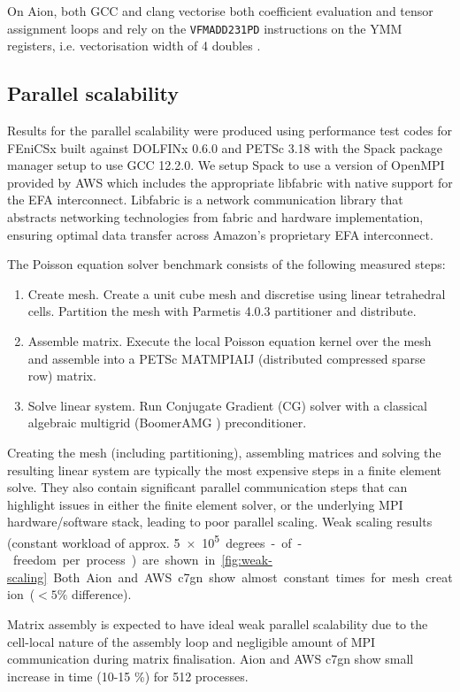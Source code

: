 On Aion, both GCC and clang vectorise both coefficient evaluation and tensor
assignment loops and rely on the \lstinline{VFMADD231PD} instructions on the
YMM registers, i.e. vectorisation width of 4 doubles
\citep{Godboltx86Clang,Godboltx86GCC}.

\subsection*{Parallel scalability}

Results for the parallel scalability were produced using performance test codes
for FEniCSx \citep{Wells2023} built against DOLFINx 0.6.0 and PETSc 3.18
\citep{petsc} with the Spack package manager setup to use GCC 12.2.0. We setup
Spack to use a version of OpenMPI provided by AWS which includes the appropriate
libfabric with native support for the EFA interconnect. Libfabric is a network
communication library that abstracts networking technologies from fabric and
hardware implementation, ensuring optimal data transfer across Amazon's
proprietary EFA interconnect.

The Poisson equation solver benchmark consists of the following measured steps:
\begin{enumerate}
    \item Create mesh. Create a unit cube mesh and discretise using linear
    tetrahedral cells. Partition the mesh with Parmetis 4.0.3 partitioner
    \citep{Karypis1998} and distribute.
    \item Assemble matrix. Execute the local Poisson equation kernel over the
    mesh and assemble into a PETSc MATMPIAIJ (distributed compressed sparse row)
    matrix.
    \item Solve linear system. Run Conjugate Gradient (CG) solver with a classical algebraic
    multigrid (BoomerAMG \citep{hypre}) preconditioner.
\end{enumerate}
Creating the mesh (including partitioning), assembling matrices and solving the
resulting linear system are typically the most expensive steps in a finite
element solve. They also contain significant parallel communication steps that
can highlight issues in either the finite element solver, or the underlying MPI
hardware/software stack, leading to poor parallel scaling. 
%
Weak scaling results (constant workload of approx. \SI{5e+5} degrees-of-freedom
per process) are shown in \autoref{fig:weak-scaling}. Both Aion and AWS c7gn
show almost constant times for mesh creation ($< 5\%$ difference).

Matrix assembly is expected to have ideal weak parallel scalability due to the
cell-local nature of the assembly loop and negligible amount of MPI
communication during matrix finalisation. Aion and AWS c7gn show small increase
in time (10-15 \%) for 512 processes.

